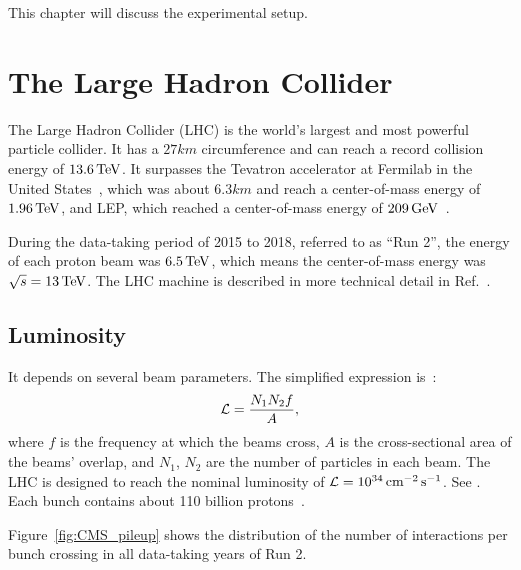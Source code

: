 
 \label{sec:dectector}

This chapter will discuss the experimental setup.




\section{The Large Hadron Collider}

The Large Hadron Collider (LHC) is the world's largest and most powerful particle collider.
It has a $27\unit{km}$ circumference and can reach a record collision energy of $13.6{\,\text{Te\hspace{-.08em}V}}$.
It surpasses the Tevatron accelerator at Fermilab in the United States~\cite{Tevatron}, which was about $6.3\unit{km}$ and reach a center-of-mass energy of $1.96{\,\text{Te\hspace{-.08em}V}}$, and LEP, which reached a center-of-mass energy of $209{\,\text{Ge\hspace{-.08em}V}}$~\cite[Section 32]{PDG_2022}.

During the data-taking period of 2015 to 2018, referred to as ``Run 2'', the energy of each proton beam was $6.5{\,\text{Te\hspace{-.08em}V}}$, which means the center-of-mass energy was $\sqrt{s}=13{\,\text{Te\hspace{-.08em}V}}$.
The LHC machine is described in more technical detail in Ref.~\cite{LHC}.

\subsection{Luminosity}\label{sec:lumi}



It depends on several beam parameters. The simplified expression is~\cite[p.~533]{PDG_2022}:
\begin{equation}\label{eq:instant_lumi}
  {\ensuremath{\mathcal{L}}} = \frac{N_1N_2f}{A},
\end{equation}
where $f$ is the frequency at which the beams cross, $A$ is the cross-sectional area of the beams' overlap, and $N_1$, $N_2$ are the number of particles in each beam.
The LHC is designed to reach the nominal luminosity of ${\mathcal{L}}=10^{34}{\text{\,cm}}^{-2}{\text{\,s}}^{-1}$.
See .
Each bunch contains about 110 billion protons~\cite{LHC,LHC_lumi_bunches_Run2}.

Figure~\ref{fig:CMS_pileup} shows the distribution of the number of interactions per bunch crossing in all data-taking years of Run 2.

